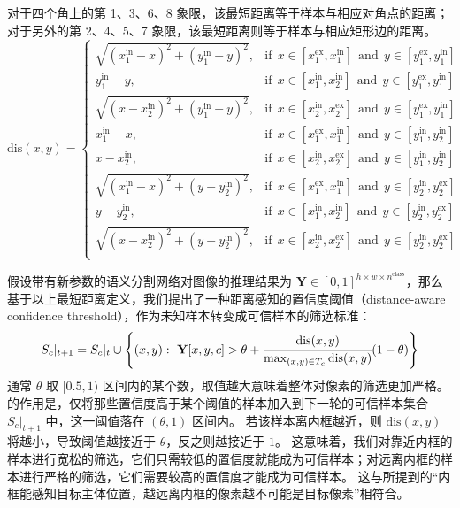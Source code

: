 对于四个角上的第 1、3、6、8 象限，该最短距离等于样本与相应对角点的距离；
对于另外的第 2、4、5、7 象限，该最短距离则等于样本与相应矩形边的距离。
\begin{equation}
\text{dis}(x,y) =
\begin{cases}
\sqrt{(x_1^\text{in} - x)^2 + (y_1^\text{in} - y)^2},&\text{if}\ \ x \in [x_1^\text{ex}, x_1^\text{in}]\ \ \text{and}\ \ y \in [y_1^\text{ex}, y_1^\text{in}]\\
y_1^\text{in} - y,&\text{if}\ \ x \in [x_1^\text{in}, x_2^\text{in}]\ \ \text{and}\ \ y \in [y_1^\text{ex}, y_1^\text{in}]\\
\sqrt{(x - x_2^\text{in})^2 + (y_1^\text{in} - y)^2},&\text{if}\ \ x \in [x_2^\text{in}, x_2^\text{ex}]\ \ \text{and}\ \ y \in [y_1^\text{ex}, y_1^\text{in}]\\
x_1^\text{in} - x,&\text{if}\ \ x \in [x_1^\text{ex}, x_1^\text{in}]\ \ \text{and}\ \ y \in [y_1^\text{in}, y_2^\text{in}]\\
x - x_2^\text{in},&\text{if}\ \ x \in [x_2^\text{in}, x_2^\text{ex}]\ \ \text{and}\ \ y \in [y_1^\text{in}, y_2^\text{in}]\\
\sqrt{(x_1^\text{in} - x)^2 + (y - y_2^\text{in})^2},&\text{if}\ \ x \in [x_1^\text{ex}, x_1^\text{in}]\ \ \text{and}\ \ y \in [y_2^\text{in}, y_2^\text{ex}]\\
y - y_2^\text{in},&\text{if}\ \ x \in [x_1^\text{in}, x_2^\text{in}]\ \ \text{and}\ \ y \in [y_2^\text{in}, y_2^\text{ex}]\\
\sqrt{(x - x_2^\text{in})^2 + (y - y_2^\text{in})^2},&\text{if}\ \ x \in [x_2^\text{in}, x_2^\text{ex}]\ \ \text{and}\ \ y \in [y_2^\text{in}, y_2^\text{ex}]\\
\end{cases}
\label{eqn:distance}
\end{equation}
\par
假设带有新参数的语义分割网络对图像的推理结果为 $\mathbf{Y} \in [0,1]^{h \times w \times n^\text{class}}$，那么基于以上最短距离定义，我们提出了一种距离感知的置信度阈值（distance-aware confidence threshold），作为未知样本转变成可信样本的筛选标准：
\begin{equation}
S_c\vert_{t+1} = S_c\vert_{t} \cup \left\{(x,y):\ \mathbf{Y}[x,y,c] > \theta + \cfrac{\text{dis}(x,y)}{\max_{(x,y) \in T_c} \text{dis}(x,y)} (1-\theta)\right\}
\label{eqn:dis-aware-conf-thres}
\end{equation}
通常 $\theta$ 取 $[0.5, 1)$ 区间内的某个数，取值越大意味着整体对像素的筛选更加严格。
的作用是，仅将那些置信度高于某个阈值的样本加入到下一轮的可信样本集合 $S_c\vert_{t+1}$ 中，这一阈值落在 $(\theta, 1)$ 区间内。
若该样本离内框越近，则 $\text{dis}(x,y)$ 将越小，导致阈值越接近于 $\theta$，反之则越接近于 $1$。
这意味着，我们对靠近内框的样本进行宽松的筛选，它们只需较低的置信度就能成为可信样本；对远离内框的样本进行严格的筛选，它们需要较高的置信度才能成为可信样本。
这与所提到的“内框能感知目标主体位置，越远离内框的像素越不可能是目标像素”相符合。
